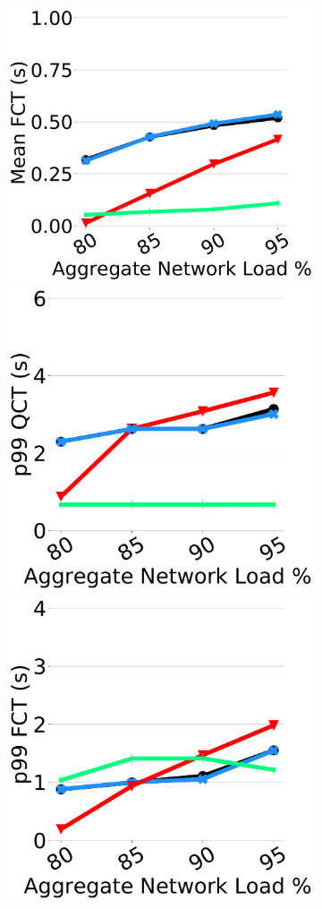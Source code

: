 \begin{figure}[th!]
\begin{subfigure}[t]{.32\linewidth}
	\includegraphics[width=0.85\linewidth]{figs/qps75fct.pdf}
	\includegraphics[width=0.85\linewidth]{figs/qps75_p99qct.pdf}
	\includegraphics[width=0.85\linewidth]{figs/qps75p99fct.pdf}

\end{subfigure}
\end{figure}
